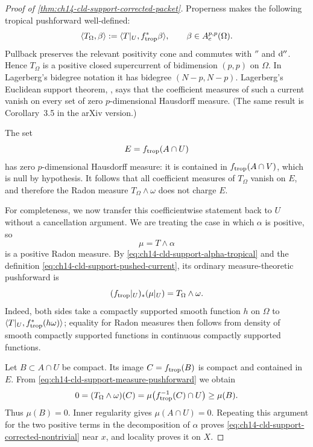 \begin{proof}[Proof of
\cref{thm:ch14-cld-support-corrected-packet}]
Properness makes the following tropical pushforward well-defined:
\begin{equation}
\label{eq:ch14-cld-support-pushed-current}
 \langle T_\Omega,\beta\rangle
   :=\langle T|_U,f_{\mathrm{trop}}^*\beta\rangle,
 \qquad \beta\in A_c^{p,p}(\Omega).
\end{equation}
Pullback preserves the relevant positivity cone and commutes with
$\dprime$ and $\mathrm d''$.  Hence $T_\Omega$ is a positive closed
supercurrent of bidimension $(p,p)$ on $\Omega$.  In Lagerberg's bidegree
notation it has bidegree $(N-p,N-p)$.  Lagerberg's Euclidean support
theorem, \cite[Corollary~4.1]{Lag12Super}, says that the coefficient measures
of such a current vanish on every set of zero $p$-dimensional Hausdorff
measure.  (The same result is Corollary~3.5 in the arXiv version.)

The set
\[
                       E=f_{\mathrm{trop}}(A\cap U)
\]
has zero $p$-dimensional Hausdorff measure: it is contained in
$f_{\mathrm{trop}}(A\cap V)$, which is null by hypothesis.  It follows that all
coefficient measures of $T_\Omega$ vanish on $E$, and therefore the Radon
measure $T_\Omega\wedge\omega$ does not charge $E$.

For completeness, we now transfer this coefficientwise statement back to
$U$ without a cancellation argument.  We are treating the case in which
$\alpha$ is positive, so
\[
                           \mu=T\wedge\alpha
\]
is a positive Radon measure.  By
\eqref{eq:ch14-cld-support-alpha-tropical} and the definition
\eqref{eq:ch14-cld-support-pushed-current}, its ordinary measure-theoretic
pushforward is
\begin{equation}
\label{eq:ch14-cld-support-measure-pushforward}
                  (f_{\mathrm{trop}}|_U)_*(\mu|_U)
                         =T_\Omega\wedge\omega.
\end{equation}
Indeed, both sides take a compactly supported smooth function $h$ on
$\Omega$ to
$\langle T|_U,f_{\mathrm{trop}}^*(h\omega)\rangle$; equality for Radon measures
then follows from density of smooth compactly supported functions in
continuous compactly supported functions.

Let $B\subset A\cap U$ be compact.  Its image $C=f_{\mathrm{trop}}(B)$ is compact
and contained in $E$.  From
\eqref{eq:ch14-cld-support-measure-pushforward} we obtain
\[
 0=(T_\Omega\wedge\omega)(C)
   =\mu\bigl(f_{\mathrm{trop}}^{-1}(C)\cap U\bigr)
   \geq\mu(B).
\]
Thus $\mu(B)=0$.  Inner regularity gives $\mu(A\cap U)=0$.  Repeating this
argument for the two positive terms in the decomposition of $\alpha$ proves
\eqref{eq:ch14-cld-support-corrected-nontrivial} near $x$, and locality
proves it on $X$.


\end{proof}
